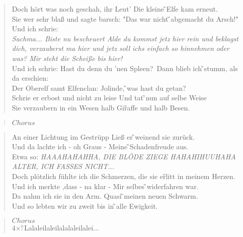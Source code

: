 \documentclass[9pt,a4paper,oneside, onecolumn]{article}
\begin{document}
\begin{verse}
Doch hört was \Am{}noch geschah, ihr \Dm{}Leut' Die kleine \G{}Elfe kam er\Em{}neut.\\
Sie wer sehr \Am{}blaß und sagte \Dm{}barsch: "Das war nicht \G{}abgemacht du \Em{}Arsch!"\\
Und ich schrie:\\
\glqq \textit{Sachma... Biste nu bescheuert Alde du kommst jetz hier rein und beklagst dich, verzauberst ma hier und jetz soll ichs einfach so hinnehmen oder was? Mir steht die Scheiße bis hier!}\grqq\ \\
Und ich schrie: \glqq \Am{}Hast du denn du 'nen \Dm{}Spleen?\grqq\ Dann blieb ich \G{}stumm, als da er\Em{}schien:\\
Der Ober\Am{}elf samt Elfen\Dm{}clan: \glqq Jolinde, \G{}was hast du ge\Em{}tan?\grqq\ \\ 
Schrie er er\F{}bost und nicht zu \C{}leise Und tat \G{}nun auf selbe \Am{}Weise\\
Sie ver\F{}zaubern in ein \C{}Wesen halb Gir\G{}affe und halb \Am{}Besen.\\
\end{verse}

\begin{verse}
$Chorus$\\
\end{verse}

\begin{verse}
An einer \Am{}Lichtung im \Dm{}Gestrüpp Ließ er \G{}weinend sie \Em{}zurück.\\
Und da \Am{}lachte ich - oh \Dm{}Graus - Meine \G{}Schadenfreude \Em{}aus.\\
Etwa so: \glqq \textit{HAAAHAHAHHA, DIE BLÖDE ZIEGE HAHAHIHUUHAHA ALTER, ICH FASSES NICHT...}\grqq\ \\
Doch plötzlich \Am{}fühlte ich die \Dm{}Schmerzen, die sie er\G{}litt in meinem \Em{}Herzen.\\
Und ich \Am{}merkte ,dass - na \Dm{}klar - Mir selbes \G{}widerfahren \Em{}war.\\
Da nahm \F{}ich sie in den \C{}Arm. Quasi \G{}meinen neuen \Am{}Schwarm.\\
Und so \F{}lebten wir zu \C{}zweit bis in \G{}alle \Am{}Ewigkeit.\\
\end{verse}

\begin{verse}
$Chorus$\\
 $4\times:$\quad\Am{}{\hskip 1cm}\F{}{\hskip 1cm}\G{}{\hskip 1cm}\Em{}{\hskip -3cm}Lalaleilaleilalalaleilalei...
\end{verse}


\end{document}
